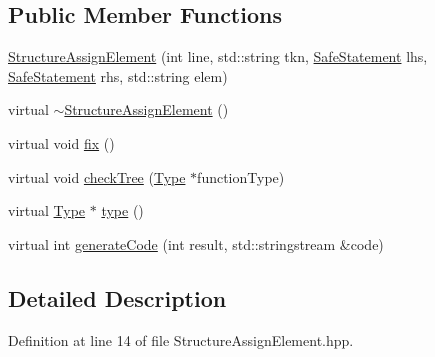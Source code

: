 \subsection*{Public Member Functions}
\begin{DoxyCompactItemize}
\item 
\hyperlink{class_scribble_core_1_1_structure_assign_element_a4289eb4cce8811f2662842c21dc2eaba}{Structure\-Assign\-Element} (int line, std\-::string tkn, \hyperlink{namespace_scribble_core_a2ad5bf236bc9164cb56f564685f15a11}{Safe\-Statement} lhs, \hyperlink{namespace_scribble_core_a2ad5bf236bc9164cb56f564685f15a11}{Safe\-Statement} rhs, std\-::string elem)
\item 
virtual \hyperlink{class_scribble_core_1_1_structure_assign_element_a1fccd1088fd2191ff3e7e57b2774ec84}{$\sim$\-Structure\-Assign\-Element} ()
\item 
virtual void \hyperlink{class_scribble_core_1_1_structure_assign_element_ac805dce2630461602792ce2302092c11}{fix} ()
\item 
virtual void \hyperlink{class_scribble_core_1_1_structure_assign_element_a4b542e99d4223248f3eba004a9a1aa37}{check\-Tree} (\hyperlink{class_scribble_core_1_1_type}{Type} $\ast$function\-Type)
\item 
virtual \hyperlink{class_scribble_core_1_1_type}{Type} $\ast$ \hyperlink{class_scribble_core_1_1_structure_assign_element_adefc987e58f40dbe43bf4a55f02f1ebd}{type} ()
\item 
virtual int \hyperlink{class_scribble_core_1_1_structure_assign_element_a88a62fc4691dda741e01cc08690ad986}{generate\-Code} (int result, std\-::stringstream \&code)
\end{DoxyCompactItemize}


\subsection{Detailed Description}


Definition at line 14 of file Structure\-Assign\-Element.\-hpp.



